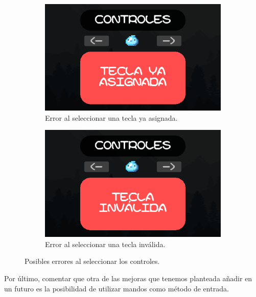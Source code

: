 \documentclass[12pt, spanish]{article}
\begin{document}
\begin{figure}[H]
    \centering
	 \begin{subfigure}[b]{0.49\textwidth}
		 \centering
		 \includegraphics[width=\textwidth]{"opciones/tecla_asignada_especifico.png"}
		 \caption{Error al seleccionar una tecla ya asignada.}\label{fig:tecla_asignada_especifico}
	 \end{subfigure}
	 \begin{subfigure}[b]{0.49\textwidth}
		 \centering
		\includegraphics[width=\textwidth]{"opciones/tecla_invalida_especifico.png"}
		\caption{Error al seleccionar una tecla inválida.}\label{fig:tecla_invalida_especifico}
   \end{subfigure}
	\caption{Posibles errores al seleccionar los controles.}\label{fig:errores_controles}
\end{figure}

Por último, comentar que otra de las mejoras que tenemos planteada añadir en un futuro es la posibilidad de utilizar mandos como método de entrada.
\end{document}
